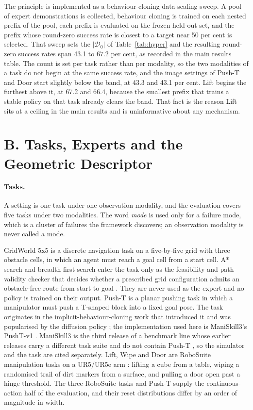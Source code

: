 \documentclass[letterpaper]{article}
\begin{document}
The principle is implemented as a behaviour-cloning data-scaling sweep. A pool of
expert demonstrations is collected, behaviour cloning is trained on each nested prefix
of the pool, each prefix is evaluated on the frozen held-out set, and the prefix whose
round-zero success rate is closest to a target near 50 per cent is selected. That sweep
sets the $|\mathcal{D}_0|$ of Table~\ref{tab:hyper} and the resulting round-zero success rates span
43.1 to 67.2 per cent, as recorded in the main results table. The count is set per task
rather than per modality, so the two modalities of a task do not begin at the same
success rate, and the image settings of Push-T and Door start slightly below the band,
at 43.3 and 43.1 per cent. Lift begins the furthest above it, at 67.2 and 66.4, because
the smallest prefix that trains a stable policy on that task already clears the band.
That fact is the reason Lift sits at a ceiling in the main results and is uninformative
about any mechanism.

\section{B. Tasks, Experts and the Geometric Descriptor}

\paragraph{Tasks.} A setting is one task under one observation modality, and the
evaluation covers five tasks under two modalities. The word \emph{mode} is used only
for a failure mode, which is a cluster of failures the framework discovers; an
observation modality is never called a mode.

GridWorld 5x5 is a discrete navigation task on a five-by-five grid with three obstacle
cells, in which an agent must reach a goal cell from a start cell. A* search and
breadth-first search enter the task only as the feasibility and path-validity checker
that decides whether a prescribed grid configuration admits an obstacle-free route from
start to goal \citep{hart1968astar, cormen2022algorithms}. They are never used as the
expert and no policy is trained on their output. Push-T is a planar pushing task in
which a manipulator must push a T-shaped block into a fixed goal pose. The task
originates in the implicit-behaviour-cloning work that introduced it
\citep{florence2021implicitbc} and was popularised by the diffusion policy
\citep{chi2023diffusionpolicy}; the implementation used here is ManiSkill3's PushT-v1
\citep{tao2024maniskill3}. ManiSkill3 is the third release of a benchmark line whose
earlier releases carry a different task suite and do not contain Push-T
\citep{mu2021maniskill, gu2023maniskill2}, so the simulator and the task are cited
separately. Lift, Wipe and Door are RoboSuite manipulation tasks on a UR5/UR5e arm
\citep{zhu2020robosuite}: lifting a cube from a table, wiping a randomised trail of
dirt markers from a surface, and pulling a door open past a hinge threshold. The three
RoboSuite tasks and Push-T supply the continuous-action half of the evaluation, and
their reset distributions differ by an order of magnitude in width.
\end{document}
